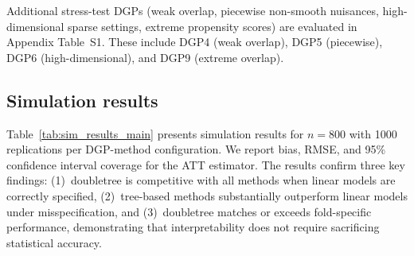 \documentclass[12pt]{article}
\begin{document}
Additional stress-test DGPs (weak overlap, piecewise non-smooth nuisances, high-dimensional sparse settings, extreme propensity scores) are evaluated in Appendix Table~S1. These include DGP4 (weak overlap), DGP5 (piecewise), DGP6 (high-dimensional), and DGP9 (extreme overlap).

\subsection{Simulation results}

Table~\ref{tab:sim_results_main} presents simulation results for $n = 800$ with 1000 replications per DGP-method configuration. We report bias, RMSE, and 95\% confidence interval coverage for the ATT estimator. The results confirm three key findings: (1)~doubletree is competitive with all methods when linear models are correctly specified, (2)~tree-based methods substantially outperform linear models under misspecification, and (3)~doubletree matches or exceeds fold-specific performance, demonstrating that interpretability does not require sacrificing statistical accuracy.
\end{document}
